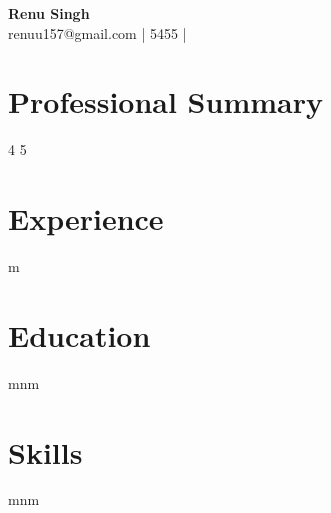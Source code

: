 \documentclass[11pt,a4paper]{article}
\begin{document}
\begin{center}
{\Huge \textbf{Renu Singh}}\\
renuu157@gmail.com | 5455 | 
\end{center}

\section*{Professional Summary}
4
5

\section*{Experience}
m

\section*{Education}
mnm

\section*{Skills}
mnm
\end{document}
